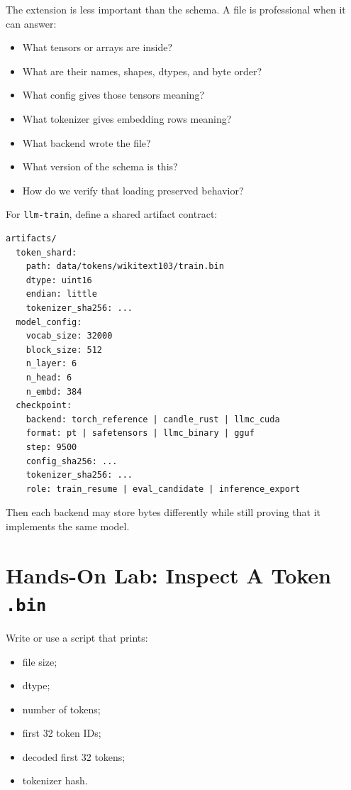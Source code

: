 The extension is less important than the schema. A file is professional when it can answer:

\begin{itemize}
  \item What tensors or arrays are inside?
  \item What are their names, shapes, dtypes, and byte order?
  \item What config gives those tensors meaning?
  \item What tokenizer gives embedding rows meaning?
  \item What backend wrote the file?
  \item What version of the schema is this?
  \item How do we verify that loading preserved behavior?
\end{itemize}

\engineering

For \texttt{llm-train}, define a shared artifact contract:

\begin{lstlisting}
artifacts/
  token_shard:
    path: data/tokens/wikitext103/train.bin
    dtype: uint16
    endian: little
    tokenizer_sha256: ...
  model_config:
    vocab_size: 32000
    block_size: 512
    n_layer: 6
    n_head: 6
    n_embd: 384
  checkpoint:
    backend: torch_reference | candle_rust | llmc_cuda
    format: pt | safetensors | llmc_binary | gguf
    step: 9500
    config_sha256: ...
    tokenizer_sha256: ...
    role: train_resume | eval_candidate | inference_export
\end{lstlisting}

Then each backend may store bytes differently while still proving that it implements the
same model.

\section{Hands-On Lab: Inspect A Token \texttt{.bin}}

Write or use a script that prints:

\begin{itemize}
  \item file size;
  \item dtype;
  \item number of tokens;
  \item first 32 token IDs;
  \item decoded first 32 tokens;
  \item tokenizer hash.
\end{itemize}

